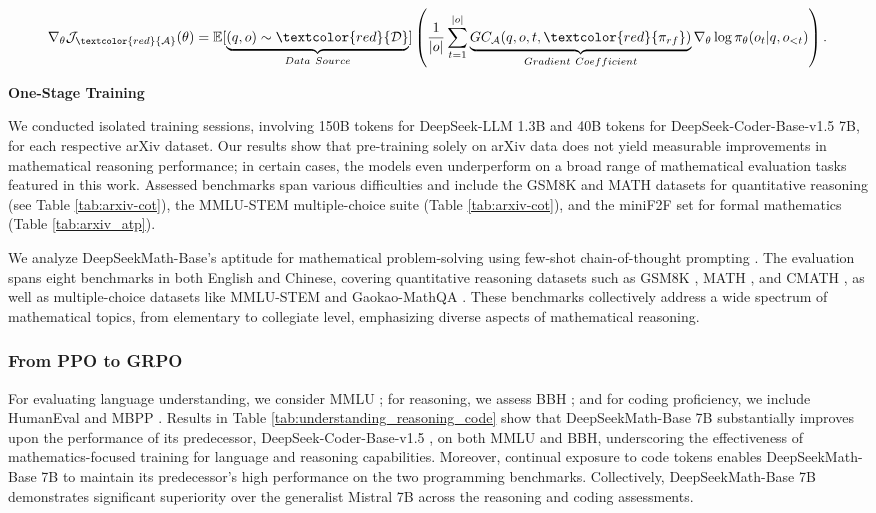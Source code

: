 \begin{itemize}[topsep=0pt]
\begin{itemize}[topsep=0pt]
\begin{equation}
    \nabla_{\theta}\mathcal{J}_{\textcolor{red}{\mathcal{A}}}(\theta) = \mathbb{E}[\underbrace{(q,o) \sim \textcolor{red}{\mathcal{D}}}_{Data \ Source}]\left( \frac{1}{|o|} \sum_{t=1}^{|o|}  \underbrace{GC_{{\mathcal{A}}}(q, o, t, \textcolor{red}{\pi_{{rf}}})}_{Gradient \ Coefficient}  \nabla_{\theta}\log \pi_{\theta}(o_t | q, o_{<t})\right).
\label{eq:objective}
\end{equation}

\textbf{One-Stage Training}

We conducted isolated training sessions, involving 150B tokens for DeepSeek-LLM 1.3B and 40B tokens for DeepSeek-Coder-Base-v1.5 7B, for each respective arXiv dataset. Our results show that pre-training solely on arXiv data does not yield measurable improvements in mathematical reasoning performance; in certain cases, the models even underperform on a broad range of mathematical evaluation tasks featured in this work. Assessed benchmarks span various difficulties and include the GSM8K and MATH datasets for quantitative reasoning (see Table \ref{tab:arxiv-cot}), the MMLU-STEM multiple-choice suite (Table \ref{tab:arxiv-cot}), and the miniF2F set for formal mathematics (Table \ref{tab:arxiv_atp}).

We analyze DeepSeekMath-Base’s aptitude for mathematical problem-solving using few-shot chain-of-thought prompting \citep{cot}. The evaluation spans eight benchmarks in both English and Chinese, covering quantitative reasoning datasets such as GSM8K \citep{gsm8k}, MATH \citep{MATH}, and CMATH \citep{wei2023cmath}, as well as multiple-choice datasets like MMLU-STEM \citep{mmlu} and Gaokao-MathQA \citep{agieval}. These benchmarks collectively address a wide spectrum of mathematical topics, from elementary to collegiate level, emphasizing diverse aspects of mathematical reasoning.

\subsubsection{From PPO to GRPO}

For evaluating language understanding, we consider MMLU \citep{mmlu}; for reasoning, we assess BBH \citep{bbh}; and for coding proficiency, we include HumanEval \citep{codex} and MBPP \citep{mbpp}. Results in Table \ref{tab:understanding_reasoning_code} show that DeepSeekMath-Base 7B substantially improves upon the performance of its predecessor, DeepSeek-Coder-Base-v1.5 \citep{deepseek-coder}, on both MMLU and BBH, underscoring the effectiveness of mathematics-focused training for language and reasoning capabilities. Moreover, continual exposure to code tokens enables DeepSeekMath-Base 7B to maintain its predecessor’s high performance on the two programming benchmarks. Collectively, DeepSeekMath-Base 7B demonstrates significant superiority over the generalist Mistral 7B \citep{mistral} across the reasoning and coding assessments.


\end{itemize}
\end{itemize}
